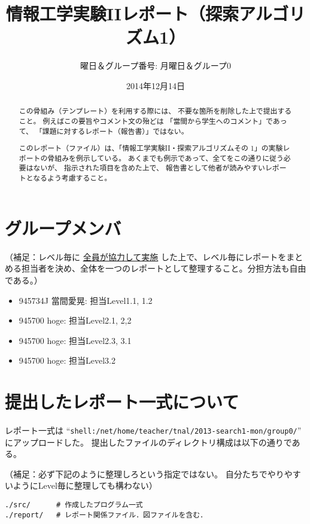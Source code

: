 \documentclass[10pt]{jarticle}
\begin{document}
\title{情報工学実験IIレポート（探索アルゴリズム1）}
\author{曜日＆グループ番号: 月曜日＆グループ0} %
\date{2014年12月14日}

\maketitle

\begin{abstract}
この骨組み（テンプレート）を利用する際には、
不要な箇所を削除した上で提出すること。
例えばこの要旨やコメント文の殆どは
「當間から学生へのコメント」であって、
「課題に対するレポート（報告書）」ではない。

このレポート（ファイル）は、「情報工学実験II・探索アルゴリズムその
1\cite{info2-search1}」の実験レポートの骨組みを例示している。
あくまでも例示であって、全てをこの通りに従う必要はないが、
指示された項目を含めた上で、
報告書として他者が読みやすいレポートとなるよう考慮すること。
\end{abstract}

\section*{グループメンバ}
（補足：レベル毎に \underline{全員が協力して実施} した上で、レベル毎にレポートをまとめる担当者を決め、全体を一つのレポートとして整理すること。分担方法も自由である。）
\begin{itemize}
 \item 945734J 當間愛晃: 担当Level1.1, 1.2
 \item 945700 hoge: 担当Level2.1, 2,2
 \item 945700 hoge: 担当Level2.3, 3.1
 \item 945700 hoge: 担当Level3.2
\end{itemize}

\section*{提出したレポート一式について}
レポート一式は
``\verb|shell:/net/home/teacher/tnal/2013-search1-mon/group0/|''
にアップロードした。
提出したファイルのディレクトリ構成は以下の通りである。

\vspace{+0.5cm}
（補足：必ず下記のように整理しろという指定ではない。
自分たちでやりやすいようにLevel毎に整理しても構わない）
\begin{breakbox}
\begin{verbatim}
./src/      # 作成したプログラム一式
./report/   # レポート関係ファイル．図ファイルを含む．
\end{verbatim}
\end{breakbox}
\end{document}
